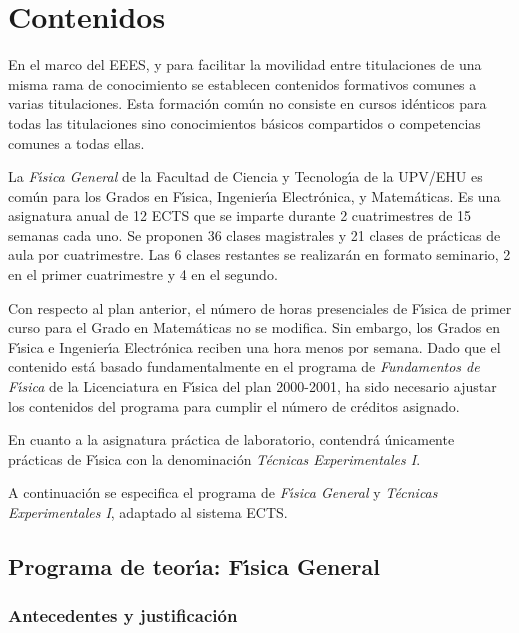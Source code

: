 
\newpage
\section {Contenidos}

En el marco del EEES, 
y para facilitar la movilidad entre titulaciones de una misma rama de
conocimiento se establecen  contenidos formativos comunes a varias
titulaciones. Esta formaci\'{o}n com\'{u}n
no consiste en cursos id\'{e}nticos para todas las titulaciones
sino conocimientos b\'{a}sicos compartidos o competencias comunes
a todas ellas.

La {\it F\'{\i}sica General} de
la Facultad de Ciencia y Tecnolog\'{\i}a de la UPV/EHU es com\'{u}n
para los Grados en F\'{\i}sica,  Ingenier\'{\i}a Electr\'{o}nica,
y Matem\'{a}ticas. 
Es una asignatura anual de 12 ECTS que se imparte durante 2 cuatrimestres de 15 
semanas cada uno. Se proponen 36 clases magistrales y 
 21 clases de pr\'{a}cticas de aula por cuatrimestre. Las 6 clases restantes
se realizar\'{a}n en formato seminario, 2 en el primer cuatrimestre y 4
en el segundo.


Con respecto al plan anterior, el n\'{u}mero de horas presenciales
de F\'{\i}sica de primer curso
para el Grado en Matem\'{a}ticas no se modifica. Sin embargo, 
  los Grados en  F\'{\i}sica  e 
Ingenier\'{\i}a Electr\'{o}nica  reciben una hora menos por semana.
Dado que el contenido  
est\'{a} basado fundamentalmente en el programa de
{\it Fundamentos de F\'{\i}sica} de la Licenciatura en F\'{\i}sica
del plan 2000-2001, ha sido necesario ajustar los contenidos
del programa para cumplir el n\'{u}mero de cr\'{e}ditos asignado. 

En cuanto a la asignatura pr\'{a}ctica de laboratorio,
 contendr\'{a} \'{u}nicamente  pr\'{a}cticas de F\'{\i}sica
con la denominaci\'{o}n
{\it T\'{e}cnicas Experimentales I}.


A continuaci\'{o}n se especifica
el programa  de   {\it F\'{\i}sica General} y
{\it T\'{e}cnicas Experimentales I}, adaptado al sistema ECTS.



\subsection{Programa  de teor\'{\i}a: F\'{\i}sica General}
\subsubsection{\large Antecedentes y justificaci\'{o}n}

